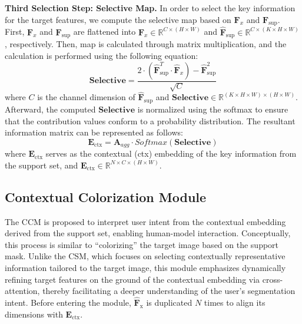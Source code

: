 {\bf Third Selection Step: Selective Map.} In order to select the key information for the target features, we compute the selective map based on \(\mathbf{F}_x\) and \(\mathbf{F}_{\text{sup}}\). First, \(\mathbf{F}_x\) and \(\mathbf{F}_{\text{sup}}\) are flattened into \(\mathbf{\hat{F}}_x \in \mathbb{R}^{ C \times (H \times W)}\) and \(\mathbf{\hat{F}}_{\text{sup}} \in \mathbb{R}^{ C \times (K  \times H \times W)}\), respectively. Then, map is calculated through matrix multiplication, and the calculation is performed using the following equation:
\begin{equation}
\mathbf{Selective} = \frac{2 \cdot (\mathbf{\hat{F}}_{\text{sup}}^T \cdot \mathbf{\hat{F}}_x) - \mathbf{\hat{F}}_{\text{sup}}^2}{\sqrt{C}} 
\end{equation}
where \(C\) is the channel dimension of \(\mathbf{\hat{F}}_{\text{sup}}\) and \( \mathbf{Selective}  \in \mathbb{R}^{ (K  \times H \times W) \times (H \times W)}\). Afterward, the computed \(\mathbf{Selective}\) is normalized using the softmax to ensure that the contribution values conform to a probability distribution. The resultant information matrix can be represented as follows:
\begin{equation}
\mathbf{E}_{\text{ctx}} = \mathbf{A}_{agg} \cdot Softmax(\mathbf{Selective})
\end{equation}
where \(\mathbf{E}_{\text{ctx}}\) serves as the contextual (ctx) embedding of the key information from the support set, and \(\mathbf{E}_{\text{ctx}} \in \mathbb{R}^{N \times C \times (H \times W)}\).

\subsection{Contextual Colorization Module}
\label{sec:Colorization}
The CCM is proposed to interpret user intent from the contextual embedding derived from the support set, enabling human-model interaction. Conceptually, this process is similar to ``colorizing'' the target image based on the support mask. Unlike the CSM, which focuses on selecting contextually representative information tailored to the target image, this module emphasizes dynamically refining target features on the ground of the contextual embedding via cross-attention, thereby facilitating a deeper understanding of the user’s segmentation intent. Before entering the module, \(\mathbf{\hat{F}}_{\text{x}}\) is duplicated \(N\) times to align its dimensions with \(\mathbf{E}_{\text{ctx}}\).

